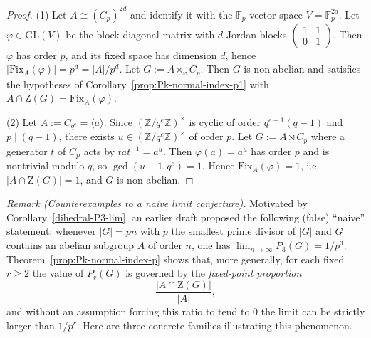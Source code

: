 \documentclass[11pt]{article}
\theoremstyle{definition}
\theoremstyle{remark}
\theoremstyle{definition}
\theoremstyle{plain}
\newcommand{\Z}{\mathrm{Z}}
\newcommand{\Fix}{\mathrm{Fix}}
\begin{document}
\begin{proof}
(1) Let $A\cong (C_p)^{2d}$ and identify it with the $\mathbb F_p$-vector space $V=\mathbb F_p^{2d}$.
Let $\varphi\in \mathrm{GL}(V)$ be the block diagonal matrix with $d$ Jordan blocks
$\left(\begin{smallmatrix}1&1\\0&1\end{smallmatrix}\right)$.
Then $\varphi$ has order $p$, and its fixed space has dimension $d$, hence $|\Fix_A(\varphi)|=p^d=|A|/p^d$.
Let $G:=A\rtimes_\varphi C_p$.
Then $G$ is non-abelian and satisfies the hypotheses of Corollary~\ref{prop:Pk-normal-index-p1} with $A\cap \Z(G)=\Fix_A(\varphi)$.

(2) Let $A:=C_{q^e}=\langle a\rangle$.
Since $(\mathbb Z/q^e\mathbb Z)^\times$ is cyclic of order $q^{e-1}(q-1)$ and $p\mid (q-1)$, there exists $u\in (\mathbb Z/q^e\mathbb Z)^\times$ of order $p$.
Let $G:=A\rtimes C_p$ where a generator $t$ of $C_p$ acts by $t a t^{-1}=a^u$.
Then $\varphi(a)=a^u$ has order $p$ and is nontrivial modulo $q$, so $\gcd(u-1,q^e)=1$.
Hence $\Fix_A(\varphi)=1$, i.e.\ $|A\cap \Z(G)|=1$, and $G$ is non-abelian.
\end{proof}

\medskip
\noindent\textit{Remark (Counterexamples to a naive limit conjecture).}
Motivated by Corollary~\ref{dihedral-P3-lim}, an earlier draft proposed the following (false) ``naive'' statement:
whenever $|G|=pn$ with $p$ the smallest prime divisor of $|G|$ and $G$ contains an abelian subgroup $A$ of order $n$,
one has $\lim_{n\to\infty}P_3(G)=1/p^3$.
Theorem~\ref{prop:Pk-normal-index-p} shows that, more generally, for each fixed $r\ge 2$ the value of $P_r(G)$ is governed by the
\emph{fixed-point proportion}
\[
\frac{|A\cap \Z(G)|}{|A|},
\]
and without an assumption forcing this ratio to tend to $0$ the limit can be strictly larger than $1/p^r$.
Here are three concrete families illustrating this phenomenon.
\end{document}
